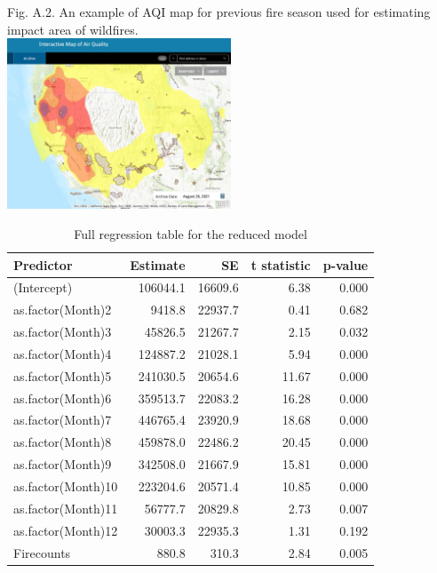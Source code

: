 \documentclass[
  12pt,
]{article}
\begin{document}
Fig. A.2. An example of AQI map for previous fire season used for estimating impact area of wildfires.\\
\includegraphics[width=0.5\textwidth,height=\textheight]{Output/AirQualityMap.JPG}

\newpage

\begin{table}

\caption{\label{tab:regressionF}Full regression table for the reduced model}
\centering
\begin{tabular}[t]{l|r|r|r|r}
\hline
Predictor & Estimate & SE & t statistic & p-value\\
\hline
(Intercept) & 106044.1 & 16609.6 & 6.38 & 0.000\\
\hline
as.factor(Month)2 & 9418.8 & 22937.7 & 0.41 & 0.682\\
\hline
as.factor(Month)3 & 45826.5 & 21267.7 & 2.15 & 0.032\\
\hline
as.factor(Month)4 & 124887.2 & 21028.1 & 5.94 & 0.000\\
\hline
as.factor(Month)5 & 241030.5 & 20654.6 & 11.67 & 0.000\\
\hline
as.factor(Month)6 & 359513.7 & 22083.2 & 16.28 & 0.000\\
\hline
as.factor(Month)7 & 446765.4 & 23920.9 & 18.68 & 0.000\\
\hline
as.factor(Month)8 & 459878.0 & 22486.2 & 20.45 & 0.000\\
\hline
as.factor(Month)9 & 342508.0 & 21667.9 & 15.81 & 0.000\\
\hline
as.factor(Month)10 & 223204.6 & 20571.4 & 10.85 & 0.000\\
\hline
as.factor(Month)11 & 56777.7 & 20829.8 & 2.73 & 0.007\\
\hline
as.factor(Month)12 & 30003.3 & 22935.3 & 1.31 & 0.192\\
\hline
Firecounts & 880.8 & 310.3 & 2.84 & 0.005\\
\hline
\end{tabular}
\end{table}
\end{document}
